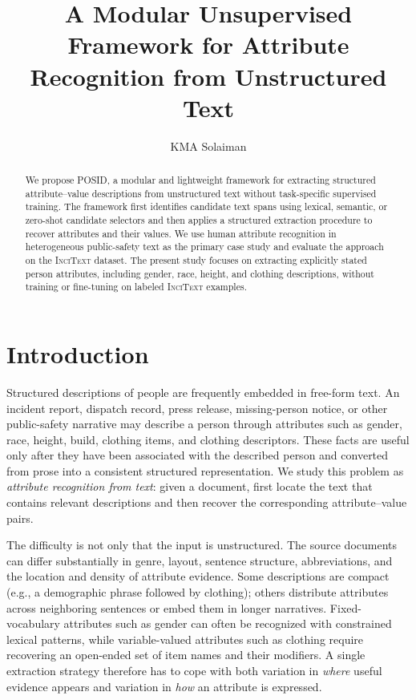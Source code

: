 \documentclass[sigconf,nonacm]{acmart}
\title{A Modular Unsupervised Framework for Attribute Recognition from Unstructured Text}
\author{KMA Solaiman}
\affiliation{%
  \institution{Purdue University}
  \city{West Lafayette}
  \state{Indiana}
  \country{USA}
}
\newcommand{\posid}{\textsc{POSID}}
\newcommand{\incitext}{\textsc{InciText}}
\begin{document}
\begin{abstract}
We propose \posid, a modular and lightweight framework for extracting structured
attribute--value descriptions from unstructured text without task-specific
supervised training. The framework first identifies candidate text spans using
lexical, semantic, or zero-shot candidate selectors and then applies a
structured extraction procedure to recover attributes and their values. We use
human attribute recognition in heterogeneous public-safety text as the primary
case study and evaluate the approach on the \incitext{} dataset. The present
study focuses on extracting explicitly stated person attributes, including
gender, race, height, and clothing descriptions, without training or fine-tuning
on labeled \incitext{} examples.
\end{abstract}

\maketitle

\section{Introduction}
\label{sec:introduction}

Structured descriptions of people are frequently embedded in free-form text.
An incident report, dispatch record, press release, missing-person notice, or
other public-safety narrative may describe a person through attributes such as
gender, race, height, build, clothing items, and clothing descriptors. These
facts are useful only after they have been associated with the described person
and converted from prose into a consistent structured representation. We study
this problem as \emph{attribute recognition from text}: given a document, first
locate the text that contains relevant descriptions and then recover the
corresponding attribute--value pairs.

The difficulty is not only that the input is unstructured. The source documents
can differ substantially in genre, layout, sentence structure, abbreviations,
and the location and density of attribute evidence. Some descriptions are
compact (e.g., a demographic phrase followed by clothing); others distribute
attributes across neighboring sentences or embed them in longer narratives.
Fixed-vocabulary attributes such as gender can often be recognized with
constrained lexical patterns, while variable-valued attributes such as clothing
require recovering an open-ended set of item names and their modifiers. A
single extraction strategy therefore has to cope with both variation in
\emph{where} useful evidence appears and variation in \emph{how} an attribute is
expressed.
\end{document}
